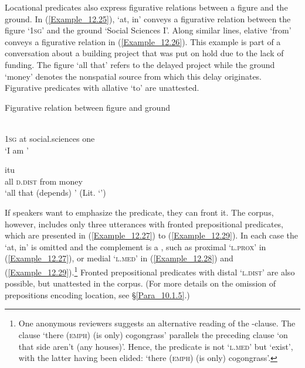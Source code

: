 Locational predicates also express figurative  relations between a figure and the ground. In (\ref{Example_12.25}),   ‘at, in’ conveys a figurative  relation between the figure  ‘1\textsc{sg}’ and the ground  ‘Social Sciences I’. Along similar lines, elative  ‘from’ conveys a figurative relation in (\ref{Example_12.26}). This example is part of a conversation about a building project that was put on hold due to the lack of funding. The figure  ‘all that’ refers to the delayed project while the ground  ‘money’ denotes the nonspatial source from which this delay originates. Figurative predicates with allative  ‘to’ are unattested.


\begin{styleExampleTitle}
Figurative  relation between figure and ground
\end{styleExampleTitle}

\ea
\label{Example_12.25}
 {} {} {}\\ %
 \textsc{1sg}  at  social.sciences  one\\
 ‘I am ’ \textstyleExampleSource{[081023-004-Cv.0020]}
\z

\ea
\label{Example_12.26}
 {itu} {} {}\\ %
 all  \textsc{d.dist}  from  money\\
\glt 
‘all that (depends) ’ (Lit. ‘’) \textstyleExampleSource{[080927-006-CvNP.0034]}
\z


If speakers want to emphasize the predicate, they can front it. The corpus, however, includes only three utterances with fronted prepositional predicates, which are presented in (\ref{Example_12.27}) to (\ref{Example_12.29}). In each case the    ‘at, in’ is omitted and the complement is a , such as proximal  ‘\textsc{l.prox}’ in (\ref{Example_12.27}), or medial  ‘\textsc{l.med}’ in (\ref{Example_12.28}) and (\ref{Example_12.29}).\footnote{One anonymous reviewers suggests an alternative reading of the -clause. The clause  ‘there (\textsc{emph}) (is only) cogongrass’ parallels the preceding clause  ‘on that side aren’t (any houses)’. Hence, the predicate is not  ‘\textsc{l.med}’ but  ‘exist’, with the latter having been elided:  ‘there (\textsc{emph}) (is only) cogongrass’.} Fronted prepositional predicates with distal  ‘\textsc{l.dist}’ are also possible, but unattested in the corpus. (For more details on the omission of prepositions encoding location, see §\ref{Para_10.1.5}.)


